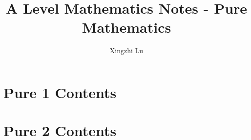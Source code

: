 \documentclass[oneside,fleqn,11pt]{book}
\title{A Level Mathematics Notes - Pure Mathematics}
\author{Xingzhi Lu}
\date{}
\begin{document}
\everymath{\displaystyle}
\maketitle
\tableofcontents

\part{Pure 1 Contents}


\part{Pure 2 Contents}
\setcounter{chapter}{0}

\end{document}
